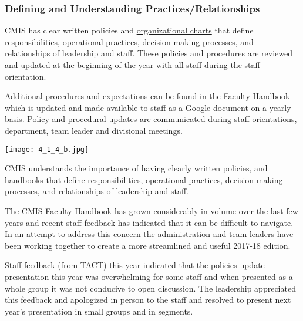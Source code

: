 \subsubsection{Defining and Understanding Practices/Relationships}



\begin{findings}
CMIS has clear written policies and \href{https://drive.google.com/a/cmis.ac.th/file/d/0Bwny3HLdIIS7RF9veFk5UXB2Q2M/view?usp=sharing}{organizational charts} that define responsibilities, operational practices, decision-making processes, and relationships of leadership and staff. These policies and procedures are reviewed and updated at the beginning of the year with all staff during the staff orientation.

Additional procedures and expectations can be found in the \href{https://docs.google.com/a/cmis.ac.th/document/d/1DrXVXsgw4U62HCGOceOKsgC8V1LDQFhHKgDB35oq4wY/edit?usp=sharing}{Faculty Handbook} which is updated and made available to staff as a Google document on a yearly basis. Policy and procedural updates are communicated during staff orientations, department, team leader and divisional meetings.

\texttt{[image: 4\_1\_4\_b.jpg]}


CMIS understands the importance of having clearly written policies, and handbooks that define responsibilities, operational practices, decision-making processes, and relationships of leadership and staff. 

The CMIS Faculty Handbook has grown considerably in volume over the last few years and recent staff feedback has indicated that it can be difficult to navigate. In an attempt to address this concern the administration and team leaders have been working together to create a more streamlined and useful  2017-18 edition. 

Staff feedback (from TACT) this year indicated that the \href{https://docs.google.com/a/cmis.ac.th/presentation/d/18ekiAcUSiwa7oJM9tdwe2OSfnC_47RkbLz8ZjEt6O9I/edit?usp=sharing}{policies update presentation} this year was overwhelming for some staff and when presented as a whole group it was not conducive to open discussion. The leadership appreciated this feedback and apologized in person to the staff and resolved to present next year's presentation in small groups and in segments. 
\end{findings}

